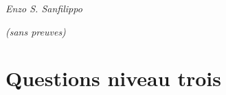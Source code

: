 \documentclass{book}
\begin{document}
	
    \begin{titlepage}

        \vspace*{9em}{\centering\Huge Mesure et intégration\par}
        \vspace{2em}
        {\hfill\itshape Enzo S. Sanfilippo}

		\vfill
		{\itshape\Large(sans preuves)}

        \clearpage
	    \vspace*{\fill}
    \end{titlepage}

    \newpage

    {
		\hypersetup{linkcolor=magenta}
		\tableofcontents
	}

    \newpage

	\chapter{Questions niveau trois}{
		\newpage

		
	}
\end{document}
